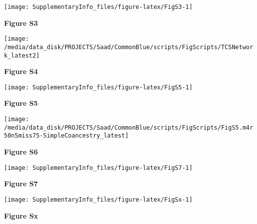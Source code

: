 \documentclass[12pt,]{article}
\begin{document}
\begin{center}\texttt{[image: SupplementaryInfo\_files/figure-latex/FigS3-1]} \end{center}

\textbf{Figure S3}

\pagebreak

\begin{center}\texttt{[image: /media/data\_disk/PROJECTS/Saad/CommonBlue/scripts/FigScripts/TCSNetwork\_latest2]} \end{center}

\textbf{Figure S4}

\begin{center}\texttt{[image: SupplementaryInfo\_files/figure-latex/FigS5-1]} \end{center}

\textbf{Figure S5}

\begin{center}\texttt{[image: /media/data\_disk/PROJECTS/Saad/CommonBlue/scripts/FigScripts/FigS5.m4r50n5miss75-SimpleCoancestry\_latest]} \end{center}

\textbf{Figure S6}

\begin{center}\texttt{[image: SupplementaryInfo\_files/figure-latex/FigS7-1]} \end{center}

\textbf{Figure S7}

\begin{center}\texttt{[image: SupplementaryInfo\_files/figure-latex/FigSx-1]} \end{center}

\textbf{Figure Sx}
\end{document}
